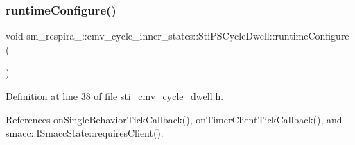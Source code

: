 \subsubsection{\texorpdfstring{runtime\+Configure()}{runtimeConfigure()}}
{\footnotesize\ttfamily void sm\+\_\+respira\+\_\+::cmv\+\_\+cycle\+\_\+inner\+\_\+states\+::\+Sti\+P\+S\+Cycle\+Dwell\+::runtime\+Configure (\begin{DoxyParamCaption}{ }\end{DoxyParamCaption})\hspace{0.3cm}{\ttfamily [inline]}}



Definition at line 38 of file sti\+\_\+cmv\+\_\+cycle\+\_\+dwell.\+h.



References on\+Single\+Behavior\+Tick\+Callback(), on\+Timer\+Client\+Tick\+Callback(), and smacc\+::\+I\+Smacc\+State\+::requires\+Client().



